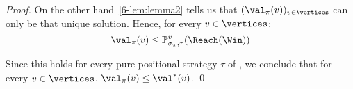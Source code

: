 \begin{proof}
  On the other hand~\cref{6-lem:lemma2} tells us that
  $(\val_\perm(v))_{v \in\vertices}$ can only be that unique
  solution. Hence, for every $v \in \vertices$:
  \[
  \val_\perm(v) \le \probm_{\sigma_\perm,\tau}^v(\Reach(\Win))
  \]


  Since this holds for every pure positional strategy $\tau$ of \Adam,
  we conclude that for every $v \in \vertices$,
  $\val_\perm(v) \le \val^*(v)$. \qed
\end{proof}

